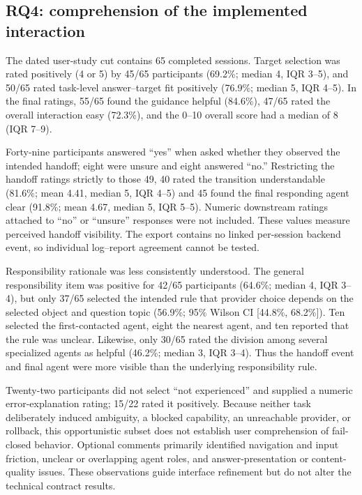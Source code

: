 \subsection{RQ4: comprehension of the implemented interaction}
\label{sec:results-userstudy}

The dated user-study cut contains 65 completed sessions.  Target selection was
rated positively (4 or 5) by 45/65 participants (69.2\%; median 4,
IQR 3--5), and 50/65 rated task-level answer--target fit positively
(76.9\%; median 5, IQR 4--5).  In the final ratings, 55/65 found the
guidance helpful (84.6\%), 47/65 rated the overall interaction easy (72.3\%),
and the 0--10 overall score had a median of 8 (IQR 7--9).

Forty-nine participants answered ``yes'' when asked whether they observed the
intended handoff; eight were unsure and eight answered ``no.''  Restricting the
handoff ratings strictly to those 49, 40 rated the transition understandable
(81.6\%; mean 4.41, median 5, IQR 4--5) and 45 found the final responding
agent clear (91.8\%; mean 4.67, median 5, IQR 5--5).  Numeric downstream
ratings attached to ``no'' or ``unsure'' responses were not included.  These
values measure perceived handoff visibility.  The export contains no linked
per-session backend event, so individual log--report agreement cannot be tested.

Responsibility rationale was less consistently understood.  The general
responsibility item was positive for 42/65 participants (64.6\%; median 4,
IQR 3--4), but only 37/65 selected the intended rule that provider choice
depends on the selected object and question topic (56.9\%; 95\% Wilson CI
[44.8\%, 68.2\%]).  Ten selected the first-contacted agent, eight the nearest
agent, and ten reported that the rule was unclear.  Likewise, only 30/65 rated
the division among several specialized agents as helpful (46.2\%; median 3,
IQR 3--4).  Thus the handoff event and final agent were more visible than the
underlying responsibility rule.

Twenty-two participants did not select ``not experienced'' and supplied a
numeric error-explanation rating; 15/22 rated it positively.  Because neither
task deliberately induced ambiguity, a blocked capability, an unreachable
provider, or rollback, this opportunistic subset does not establish user
comprehension of fail-closed behavior.  Optional comments primarily identified
navigation and input friction, unclear or overlapping agent roles, and
answer-presentation or content-quality issues.  These observations guide
interface refinement but do not alter the technical contract results.
